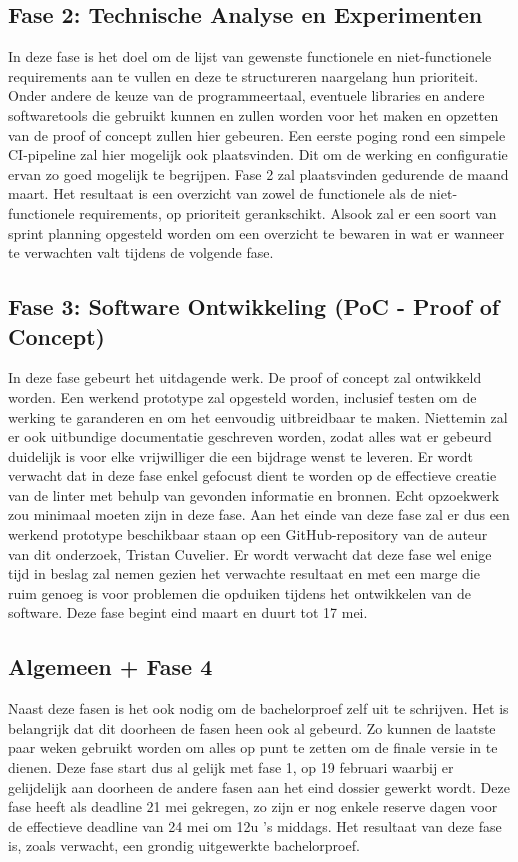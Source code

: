 \subsection{Fase 2: Technische Analyse en Experimenten}
In deze fase is het doel om de lijst van gewenste functionele en niet-functionele requirements aan te vullen en deze te structureren naargelang hun prioriteit. Onder andere de keuze van de programmeertaal, eventuele libraries en andere softwaretools die gebruikt kunnen en zullen worden voor het maken en opzetten 
van de proof of concept zullen hier gebeuren. Een eerste poging rond een simpele CI-pipeline zal hier mogelijk ook plaatsvinden. Dit om de werking en configuratie ervan zo goed mogelijk te begrijpen. Fase 2 zal plaatsvinden gedurende de maand maart. Het resultaat is een overzicht van zowel de functionele als de niet-functionele requirements, op prioriteit gerankschikt. Alsook zal er een soort van sprint planning opgesteld worden om een overzicht te bewaren in wat er wanneer te verwachten valt tijdens de volgende fase.

\subsection{Fase 3: Software Ontwikkeling (PoC - Proof of Concept)}
In deze fase gebeurt het uitdagende werk. De proof of concept zal ontwikkeld worden. Een werkend prototype zal opgesteld worden, inclusief testen om de werking te garanderen en om het eenvoudig uitbreidbaar te maken. Niettemin zal er ook uitbundige documentatie geschreven worden, zodat 
alles wat er gebeurd duidelijk is voor elke vrijwilliger die een bijdrage wenst te leveren. Er wordt verwacht dat in deze fase enkel gefocust dient te worden op de effectieve creatie van de linter met behulp van gevonden informatie en bronnen. Echt opzoekwerk zou minimaal moeten zijn in deze fase.
Aan het einde van deze fase zal er dus een werkend prototype beschikbaar staan op een GitHub-repository van de auteur van dit onderzoek, Tristan Cuvelier. 
Er wordt verwacht dat deze fase wel enige tijd in beslag zal nemen gezien het verwachte resultaat en met een marge die ruim genoeg is voor problemen die opduiken tijdens het ontwikkelen van de software. Deze fase begint eind maart en duurt tot 17 mei.

\subsection{Algemeen + Fase 4}
Naast deze fasen is het ook nodig om de bachelorproef zelf uit te schrijven. Het is belangrijk dat dit doorheen de fasen heen ook al gebeurd. Zo kunnen de laatste paar weken gebruikt worden om alles op punt te zetten om de finale versie in te dienen. Deze fase start dus al gelijk met fase 1, op 19 februari waarbij er gelijdelijk aan doorheen de andere fasen aan het eind dossier gewerkt wordt. Deze fase heeft als deadline 21 mei gekregen, zo zijn er nog enkele reserve dagen voor de effectieve deadline van 24 mei om 12u 's middags.
Het resultaat van deze fase is, zoals verwacht, een grondig uitgewerkte bachelorproef.

